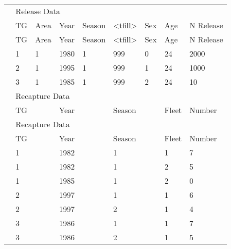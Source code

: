 \begin{center}
\begin{tabular}{p{1.1cm} p{1.1cm} p{1.1cm} p{1.1cm} p{1.1cm} p{1.1cm} p{1.1cm} p{1.1cm} p{3cm}}
		 \hline
		 & \multicolumn{8}{l}{Release Data} \Tstrut\\
		 & TG & Area & Year & Season & <tfill> & Sex & Age & N Release \Bstrut\\ 
		 & TG & Area & Year & Season & <tfill> & Sex & Age & N Release \Bstrut\\ 
		 \hline
		 & 1 & 1 & 1980 & 1 & 999 & 0 & 24 & 2000 \Tstrut\\
		 & 2 & 1 & 1995 & 1 & 999 & 1 & 24 & 1000 \\
		 & 3 & 1 & 1985 & 1 & 999 & 2 & 24 & 10 \Bstrut\\
		 \hline
		 & \multicolumn{8}{l}{Recapture Data} \Tstrut\\
		 & TG &  & Year &  & Season &  & Fleet & Number \Bstrut\\ 
		 & \multicolumn{8}{l}{Recapture Data} \Tstrut\\
		 & TG &  & Year &  & Season &  & Fleet & Number \Bstrut\\ 
		 \hline
		 & 1 & & 1982 & & 1 & & 1 & 7 \Tstrut\\
		 & 1 & & 1982 & & 1 & & 2 & 5 \\
		 & 1 & & 1985 & & 1 & & 2 & 0 \\
		 & 2 & & 1997 & & 1 & & 1 & 6 \\
		 & 2 & & 1997 & & 2 & & 1 & 4 \\
		 & 3 & & 1986 & & 1 & & 1 & 7 \\
		 & 3 & & 1986 & & 2 & & 1 & 5 \Bstrut\\
		 \hline
	\end{tabular}
\end{center}

